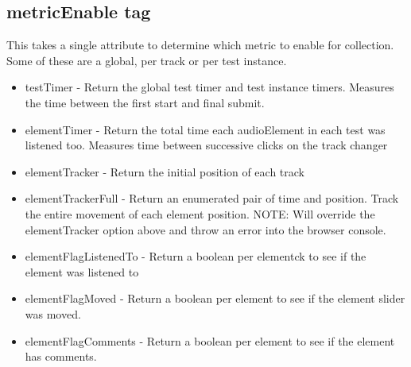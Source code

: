 \documentclass{article}
\begin{document}
\subsection{metricEnable tag}
This takes a single attribute to determine which metric to enable for collection. Some of these are a global, per track or per test instance.
\begin{itemize}
\item testTimer - Return the global test timer and test instance timers. Measures the time between the first start and final submit.
\item elementTimer - Return the total time each audioElement in each test was listened too. Measures time between successive clicks on the track changer
\item elementTracker - Return the initial position of each track
\item elementTrackerFull - Return an enumerated pair of time and position. Track the entire movement of each element position. NOTE: Will override the elementTracker option above and throw an error into the browser console.
\item elementFlagListenedTo - Return a boolean per elementck to see if the element was listened to
\item elementFlagMoved - Return a boolean per element to see if the element slider was moved.
\item elementFlagComments - Return a boolean per element to see if the element has comments.
\end{itemize}
\end{document}
